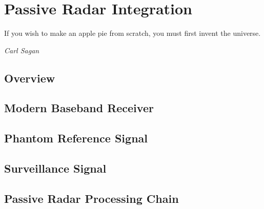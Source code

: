 \documentclass[class=report,11pt,crop=false]{standalone}
\begin{document}
\chapter{Passive Radar Integration}
\epigraph{If you wish to make an apple pie from scratch, you must first invent the universe.}%
    {\emph{Carl Sagan}}

\section{Overview}

\blindmathpaper

\section{Modern Baseband Receiver}
\blindmathpaper

\section{Phantom Reference Signal}
\blindmathpaper

\section{Surveillance Signal}
\blindmathpaper

\section{Passive Radar Processing Chain}
\blindmathpaper











\ifstandalone

\printnoidxglossary[type=\acronymtype,nonumberlist]
\fi
\end{document}
